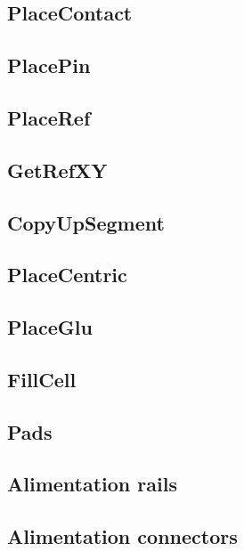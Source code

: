 \documentclass[11pt]{article}
\begin{document}
    \subsection{PlaceContact}
    \label{seccontact}
    
    \subsection{PlacePin}
    \label{secpin}
        
    \subsection{PlaceRef}
    \label{secref}
    
    \subsection{GetRefXY}
    \label{secgetref}
    
    \subsection{CopyUpSegment}
    \label{seccopy}
        
    \subsection{PlaceCentric}
    \label{seccentric}
    
    \subsection{PlaceGlu}
    \label{secglu}
    
    \subsection{FillCell}
    \label{secfillcell}
    
    \subsection{Pads}
    \label{secpads}
    
    \subsection{Alimentation rails}
    \label{secrails}
    
    \subsection{Alimentation connectors}
    \label{secconnectors}
    
\end{document}
